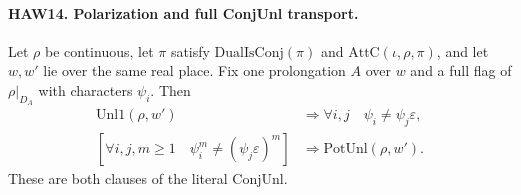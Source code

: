 \paragraph{HAW14. Polarization and full ConjUnl transport.}
\label{claim:HAW14}
Let $\rho$ be continuous, let $\pi$ satisfy
$\mathrm{DualIsConj}(\pi)$ and $\mathrm{AttC}(\iota,\rho,\pi)$,
and let $w,w'$ lie over the same real place.  Fix one
prolongation $A$ over $w$ and a full flag of $\rho|_{D_A}$
with characters $\psi_i$.  Then
\[
 \begin{split}
 \mathrm{Unl1}(\rho,w')&\Longrightarrow
                         \forall i,j\quad\psi_i\ne\psi_j\varepsilon,\\
 [\forall i,j, m\ge1\quad\psi_i^m\ne(\psi_j\varepsilon)^m]
                 &\Longrightarrow\mathrm{PotUnl}(\rho,w').
 \end{split}
 \tag{HAW.20}
\]
These are both clauses of the literal $\mathrm{ConjUnl}$.
